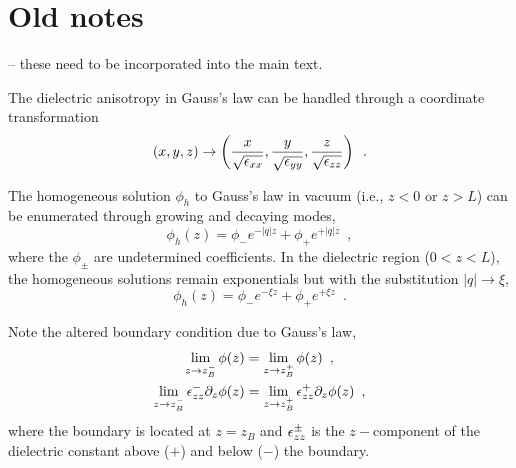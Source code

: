 \section{Old notes}
\label{appendix: Coulomb}


 -- these need to be incorporated into the main text.


The dielectric anisotropy in Gauss's law can be handled through a coordinate transformation \cite{Mele2001,Ivchenko2021}
\begin{equation}
\left( x,y,z\right) \to \left( \frac{x}{\sqrt{\epsilon_{xx}}}, \frac{y}{\sqrt{\epsilon_{yy}}}, \frac{z}{\sqrt{\epsilon_{zz}}}\right)
\,\,\,.
\end{equation}


The homogeneous solution $\phi_h$ to Gauss's law in vacuum (i.e., $z<0$ or $z>L$) can be enumerated through growing and decaying modes,
\begin{equation}
    \label{app phih vac def}
    \phi_h(z) = \phi_- e^{-|q| z} + \phi_+ e^{+|q| z}
    \,\,\,,
\end{equation}
where the $\phi_{\pm}$ are undetermined coefficients.  In the dielectric region ($0<z<L$), the homogeneous solutions remain exponentials but with the substitution $|q|\to\xi$,
\begin{equation}
    \label{app phih mat def}
    \phi_h(z) = \phi_- e^{-\xi z} + \phi_+ e^{+\xi z}
    \,\,\,.
\end{equation}


Note the altered boundary condition due to Gauss's law,
\begin{align}
    \label{app BC1 def}
    \lim_{z\to z_B^-}\phi(z) &= \lim_{z\to z_B^+}\phi(z)\,\,\,,
    \\ \label{app BC2 def}
    \lim_{z\to z_B^-}\epsilon_{zz}^-\partial_z\phi(z) &= \lim_{z\to z_B^+}\epsilon_{zz}^+\partial_z\phi(z)
    \,\,\,,
\end{align}
where the boundary is located at $z=z_B$ and $\epsilon_{zz}^{\pm}$ is the $z-$component of the dielectric constant above ($+$) and below ($-$) the boundary.